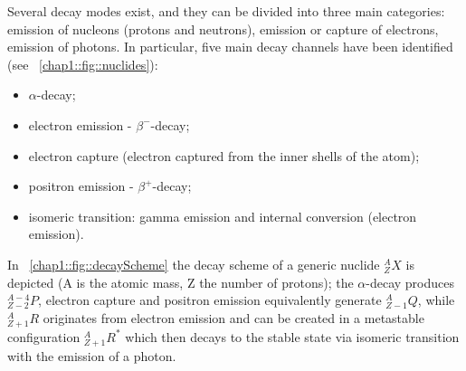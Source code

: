 Several decay modes exist, and they can be divided into three main categories: emission of nucleons (protons and neutrons), emission or capture of electrons, emission of photons. In particular, five main decay channels have been identified (see \figurename~\ref{chap1::fig::nuclides}):
\begin{itemize}
\item $\alpha$-decay;
\item electron emission - $\beta^-$-decay;
\item electron capture (electron captured from the inner shells of the atom);
\item positron emission - $\beta^+$-decay;
\item isomeric transition: gamma emission and internal conversion (electron emission).
\end{itemize}
In \figurename~\ref{chap1::fig::decayScheme} the decay scheme of a generic nuclide $^{A}_{Z}X$ is depicted (A is the atomic mass, Z the number of protons); the $\alpha$-decay produces $^{A-4}_{Z-2}P$, electron capture and positron emission equivalently generate $^{A}_{Z-1}Q$, while $^{A}_{Z+1}R$ originates from electron emission and can be created in a metastable configuration $^{A}_{Z+1}R^*$ which then decays to the stable state via isomeric transition with the emission of a photon.  

